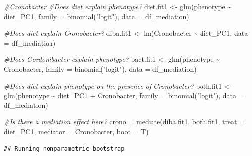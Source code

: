 \documentclass[
]{article}
\newenvironment{Shaded}{\begin{snugshade}}{\end{snugshade}}
\newcommand{\AttributeTok}[1]{\textcolor[rgb]{0.77,0.63,0.00}{#1}}
\newcommand{\CommentTok}[1]{\textcolor[rgb]{0.56,0.35,0.01}{\textit{#1}}}
\newcommand{\FunctionTok}[1]{\textcolor[rgb]{0.00,0.00,0.00}{#1}}
\newcommand{\NormalTok}[1]{#1}
\newcommand{\OtherTok}[1]{\textcolor[rgb]{0.56,0.35,0.01}{#1}}
\newcommand{\SpecialCharTok}[1]{\textcolor[rgb]{0.00,0.00,0.00}{#1}}
\newcommand{\StringTok}[1]{\textcolor[rgb]{0.31,0.60,0.02}{#1}}
\begin{document}
\begin{Shaded}
\begin{Highlighting}[]
\CommentTok{\#Cronobacter}
\CommentTok{\#Does diet explain phenotype?}
\NormalTok{diet.fit1  }\OtherTok{\textless{}{-}} \FunctionTok{glm}\NormalTok{(phenotype }\SpecialCharTok{\textasciitilde{}}\NormalTok{ diet\_PC1, }
                  \AttributeTok{family =} \FunctionTok{binomial}\NormalTok{(}\StringTok{"logit"}\NormalTok{), }\AttributeTok{data =}\NormalTok{ df\_mediation)}

\CommentTok{\#Does diet explain Cronobacter?}
\NormalTok{diba.fit1  }\OtherTok{\textless{}{-}}  \FunctionTok{lm}\NormalTok{(Cronobacter }\SpecialCharTok{\textasciitilde{}}\NormalTok{ diet\_PC1, }\AttributeTok{data =}\NormalTok{ df\_mediation)}

\CommentTok{\#Does Gordonibacter explain phenotype?}
\NormalTok{bact.fit1  }\OtherTok{\textless{}{-}}  \FunctionTok{glm}\NormalTok{(phenotype }\SpecialCharTok{\textasciitilde{}}\NormalTok{ Cronobacter, }
                    \AttributeTok{family =} \FunctionTok{binomial}\NormalTok{(}\StringTok{"logit"}\NormalTok{), }\AttributeTok{data =}\NormalTok{ df\_mediation)}

\CommentTok{\#Does diet explain phenotype on the presence of Cronobacter?}
\NormalTok{both.fit1  }\OtherTok{\textless{}{-}} \FunctionTok{glm}\NormalTok{(phenotype }\SpecialCharTok{\textasciitilde{}}\NormalTok{ diet\_PC1 }\SpecialCharTok{+}\NormalTok{ Cronobacter, }
                  \AttributeTok{family =} \FunctionTok{binomial}\NormalTok{(}\StringTok{"logit"}\NormalTok{), }\AttributeTok{data =}\NormalTok{ df\_mediation)}

\CommentTok{\#Is there a mediation effect here?}
\NormalTok{crono }\OtherTok{=} \FunctionTok{mediate}\NormalTok{(diba.fit1, both.fit1, }
                \AttributeTok{treat =} \StringTok{\textquotesingle{}diet\_PC1\textquotesingle{}}\NormalTok{, }\AttributeTok{mediator =} \StringTok{\textquotesingle{}Cronobacter\textquotesingle{}}\NormalTok{, }\AttributeTok{boot =}\NormalTok{ T)}
\end{Highlighting}
\end{Shaded}

\begin{verbatim}
## Running nonparametric bootstrap
\end{verbatim}
\end{document}
